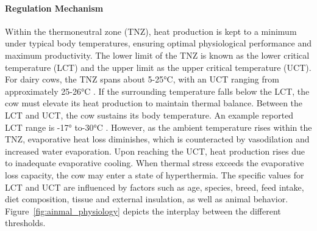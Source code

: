 \paragraph{Regulation Mechanism}
Within the thermoneutral zone (TNZ), heat production is kept to a minimum under typical body temperatures, ensuring optimal physiological performance and maximum productivity. The lower limit of the TNZ is known as the lower critical temperature (LCT) and the upper limit as the upper critical temperature (UCT). For dairy cows, the TNZ spans about 5-25°C, with an UCT ranging from approximately 25-26°C \citep{becker_invited_2020}. If the surrounding temperature falls below the LCT, the cow must elevate its heat production to maintain thermal balance. Between the LCT and UCT, the cow sustains its body temperature. An example reported LCT range is -17° to-30°C \citep{kadzere_heat_2002, bryant_quantifying_2007}. However, as the ambient temperature rises within the TNZ, evaporative heat loss diminishes, which is counteracted by vasodilation and increased water evaporation. Upon reaching the UCT, heat production rises due to inadequate evaporative cooling. When thermal stress exceeds the evaporative loss capacity, the cow may enter a state of hyperthermia. The specific values for LCT and UCT are influenced by factors such as age, species, breed, feed intake, diet composition, tissue and external insulation, as well as animal behavior. Figure~\ref{fig:ainmal_physiology} depicts the interplay between the different thresholds.

